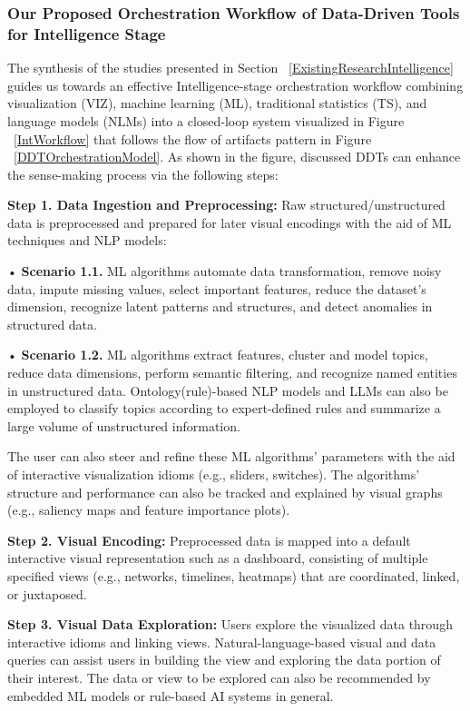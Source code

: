 \documentclass{sfuthesis}
\begin{document}
\subsubsection{Our Proposed Orchestration Workflow of Data-Driven Tools for Intelligence Stage}
The synthesis of the studies presented in Section ~\ref{ExistingResearchIntelligence} guides us towards an effective Intelligence-stage orchestration workflow combining visualization (VIZ), machine learning (ML), traditional statistics (TS), and language models (NLMs) into a closed-loop system visualized in Figure ~\ref{IntWorkflow} that follows the flow of artifacts pattern in Figure ~\ref{DDTOrchestrationModel}. As shown in the figure, discussed DDTs can enhance the sense-making process via the following steps:\par
\textbf{Step 1. Data Ingestion and Preprocessing:} Raw structured/unstructured data is preprocessed and prepared for later visual encodings with the aid of ML techniques and NLP models:\par
{
\setlength{\leftskip}{0.5cm}
\noindent•	\textbf{Scenario 1.1.} ML algorithms automate data transformation, remove noisy data, impute missing values, select important features, reduce the dataset’s dimension, recognize latent patterns and structures, and detect anomalies in structured data.\par
\noindent•	\textbf{Scenario 1.2.} ML algorithms extract features, cluster and model topics, reduce data dimensions, perform semantic filtering, and recognize named entities in unstructured data. Ontology(rule)-based NLP models and LLMs can also be employed to classify topics according to expert-defined rules and summarize a large volume of unstructured information.\par
}
The user can also steer and refine these ML algorithms’ parameters with the aid of interactive visualization idioms (e.g., sliders, switches). The algorithms’ structure and performance can also be tracked and explained by visual graphs (e.g., saliency maps and feature importance plots).\par
\textbf{Step 2. Visual Encoding:} Preprocessed data is mapped into a default interactive visual representation such as a dashboard, consisting of multiple specified views (e.g., networks, timelines, heatmaps) that are coordinated, linked, or juxtaposed.\par
\textbf{Step 3. Visual Data Exploration:} Users explore the visualized data through interactive idioms and linking views. Natural-language-based visual and data queries can assist users in building the view and exploring the data portion of their interest. The data or view to be explored can also be recommended by embedded ML models or rule-based AI systems in general.\par
\end{document}
